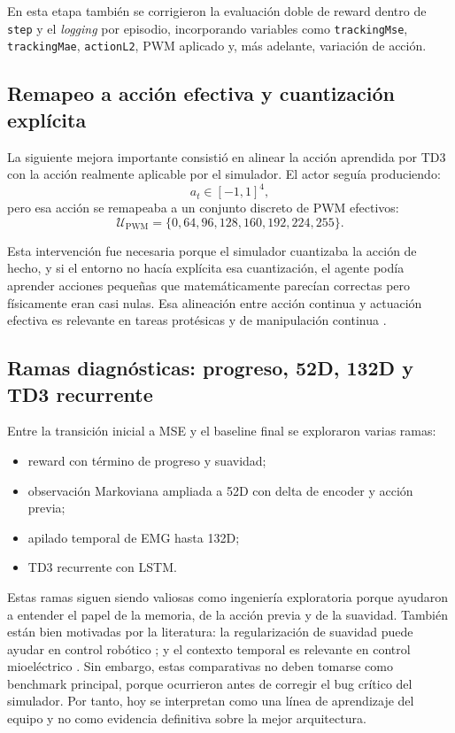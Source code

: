 \documentclass[11pt,a4paper]{article}
\begin{document}
En esta etapa tambi\'en se corrigieron la evaluaci\'on doble de reward dentro de \texttt{step} y el \emph{logging} por episodio, incorporando variables como \texttt{trackingMse}, \texttt{trackingMae}, \texttt{actionL2}, PWM aplicado y, m\'as adelante, variaci\'on de acci\'on.

\subsection{Remapeo a acci\'on efectiva y cuantizaci\'on expl\'icita}

La siguiente mejora importante consisti\'o en alinear la acci\'on aprendida por TD3 con la acci\'on realmente aplicable por el simulador. El actor segu\'ia produciendo:
\begin{equation}
a_t \in [-1,1]^4,
\end{equation}
pero esa acci\'on se remapeaba a un conjunto discreto de PWM efectivos:
\begin{equation}
\mathcal{U}_{\mathrm{PWM}} = \{0, 64, 96, 128, 160, 192, 224, 255\}.
\end{equation}

Esta intervenci\'on fue necesaria porque el simulador cuantizaba la acci\'on de hecho, y si el entorno no hac\'ia expl\'icita esa cuantizaci\'on, el agente pod\'ia aprender acciones peque\~nas que matem\'aticamente parec\'ian correctas pero f\'isicamente eran casi nulas. Esa alineaci\'on entre acci\'on continua y actuaci\'on efectiva es relevante en tareas prot\'esicas y de manipulaci\'on continua \citep{done2025prostheticrl,deng2025reward}.

\subsection{Ramas diagn\'osticas: progreso, 52D, 132D y TD3 recurrente}

Entre la transici\'on inicial a MSE y el baseline final se exploraron varias ramas:
\begin{itemize}[leftmargin=1.2cm]
    \item reward con t\'ermino de progreso y suavidad;
    \item observaci\'on Markoviana ampliada a 52D con delta de encoder y acci\'on previa;
    \item apilado temporal de EMG hasta 132D;
    \item TD3 recurrente con LSTM.
\end{itemize}

Estas ramas siguen siendo valiosas como ingenier\'ia exploratoria porque ayudaron a entender el papel de la memoria, de la acci\'on previa y de la suavidad. Tambi\'en est\'an bien motivadas por la literatura: la regularizaci\'on de suavidad puede ayudar en control rob\'otico \citep{lee2024smoothness}; y el contexto temporal es relevante en control mioel\'ectrico \citep{chen2023review}. Sin embargo, estas comparativas no deben tomarse como benchmark principal, porque ocurrieron antes de corregir el bug cr\'itico del simulador. Por tanto, hoy se interpretan como una l\'inea de aprendizaje del equipo y no como evidencia definitiva sobre la mejor arquitectura.
\end{document}
